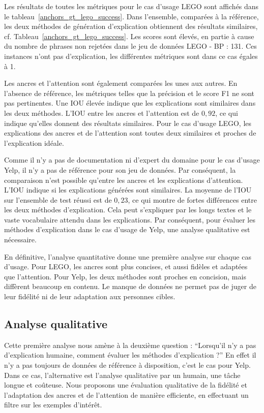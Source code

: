 Les résultats de toutes les métriques pour le cas d'usage LEGO sont affichés dans le tableau~\ref{anchors_gt_lego_success}. Dans l'ensemble, comparées à la référence, les deux méthodes de génération d'explication obtiennent des résultats similaires, cf. Tableau~\ref{anchors_gt_lego_success}.
Les scores sont élevés, en partie à cause du nombre de phrases non rejetées dans le jeu de données LEGO - BP : 131. Ces instances n'ont pas d'explication, les différentes métriques sont dans ce cas égales à 1.

Les ancres et l'attention sont également comparées les unes aux autres. En l'absence de référence, les métriques telles que la précision et le score F1 ne sont pas pertinentes. Une IOU élevée indique que les explications sont similaires dans les deux méthodes. L'IOU entre les ancres et l'attention est de $0,92$, ce qui indique qu'elles donnent des résultats similaires. Pour le cas d'usage LEGO, les explications des ancres et de l'attention sont toutes deux similaires et proches de l'explication idéale.

Comme il n'y a pas de documentation ni d'expert du domaine pour le cas d'usage Yelp, il n'y a pas de référence pour son jeu de données. Par conséquent, la comparaison n'est possible qu'entre les ancres et les explications d'attention. L'IOU indique si les explications générées sont similaires. La moyenne de l’IOU sur l'ensemble de test réussi est de $0,23$, ce qui montre de fortes différences entre les deux méthodes d'explication. Cela peut s'expliquer par les longs textes et le vaste vocabulaire attendu dans les explications. Par conséquent, pour évaluer les méthodes d'explication dans le cas d'usage de Yelp, une analyse qualitative est nécessaire.

En définitive, l'analyse quantitative donne une première analyse sur chaque cas d'usage. Pour LEGO, les ancres sont plus concises, et aussi fidèles et adaptées que l'attention. Pour Yelp, les deux méthodes sont proches en concision, mais diffèrent beaucoup en contenu. Le manque de données ne permet pas de juger de leur fidélité ni de leur adaptation aux personnes cibles.

\subsection{Analyse qualitative} \label{C3:ql}

Cette première analyse nous amène à la deuxième question : ``Lorsqu'il n'y a pas d'explication humaine, comment évaluer les méthodes d'explication ?''
En effet il n'y a pas toujours de données de référence à disposition, c'est le cas pour Yelp. Dans ce cas, l'alternative est l'analyse qualitative par un humain, une tâche longue et coûteuse. Nous proposons une évaluation qualitative de la fidélité et l'adaptation des ancres et de l'attention de manière efficiente, en effectuant un filtre sur les exemples d'intérêt.

